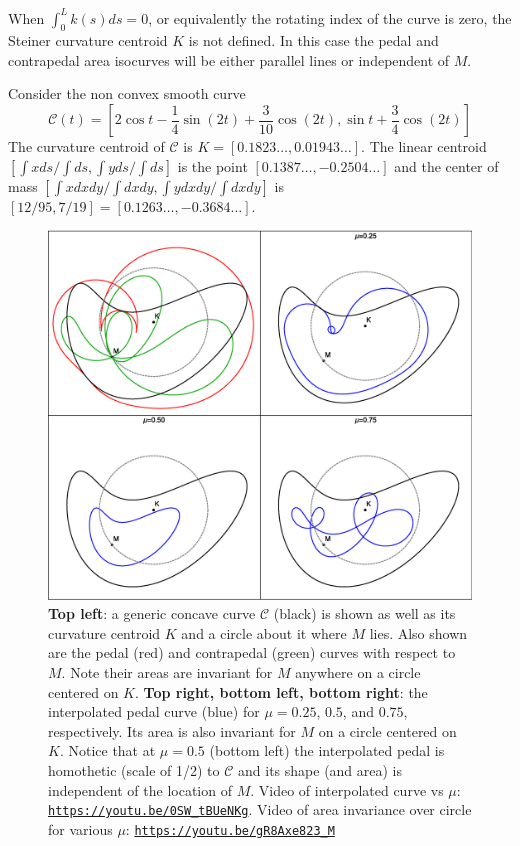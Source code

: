 \begin{remark*} When $\int_0^L k(s)ds=0$, or equivalently the rotating index of the curve is zero, the Steiner curvature centroid $K$ is not defined. In this case the pedal and contrapedal area isocurves will be either parallel lines or independent of $M$.
\end{remark*}

\begin{example} Consider the non convex smooth curve 
\[ 
\mathcal{C}(t)= [  2 \cos t -\frac{1}{4}\sin( 2t) + \frac{3}{10}\cos(2t),
\sin{t} + \frac{3}{4}\cos(2t)] \] 
The curvature centroid of $\mathcal{C}$ is $K=[0.1823\ldots, 0.01943\ldots]$. The linear centroid
$[\int xds/\int ds, \int yds/\int ds]$ is the point $[0.1387\ldots, -0.2504\ldots ] $ and the center of mass $[\int xdxdy/\int dxdy, \int ydxdy/\int dxdy]$ is $[12/95, 7/19]=[0.1263\ldots, -0.3684\ldots]$.
 
\end{example}


\begin{figure}
    \centering
    \includegraphics[width=\textwidth]{pics/0070_interpolated_concave.eps}
    \caption{\textbf{Top left}: a generic concave curve $\mathcal{C}$ (black) is shown as well as its curvature centroid $K$ and a circle about it where $M$ lies. Also shown are the pedal (red) and contrapedal (green) curves with respect to $M$. Note their areas are invariant for $M$ anywhere on a circle centered on $K$. \textbf{Top right, bottom left, bottom right}: the interpolated pedal curve (blue) for $\mu=0.25$, $0.5$, and $0.75$, respectively. Its area is also invariant for $M$ on a circle centered on $K$. Notice that at $\mu=0.5$ (bottom left) the interpolated pedal is homothetic (scale of 1/2) to $\mathcal{C}$ and its shape (and area) is independent of the location of $M$. Video of interpolated curve vs $\mu$: \href{
    https://youtu.be/0SW\_tBUeNKg}{\texttt{https://youtu.be/0SW\_tBUeNKg}}. Video of area invariance over circle for various $\mu$: \href{https://youtu.be/gR8Axe823\_M}{\texttt{https://youtu.be/gR8Axe823\_M}}}
    \label{fig:interp-concave}
\end{figure}